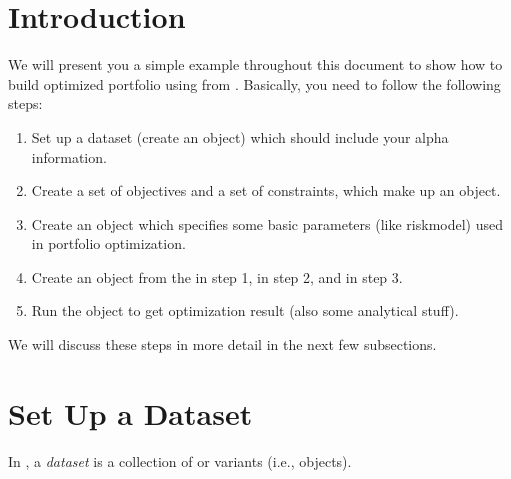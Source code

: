 \section{Introduction}
\setcounter{page}{1}

We will present you a simple example throughout this document to show how to build optimized portfolio using \axioma{} from \matlab.
Basically, you need to follow the following steps:

\begin{enumerate}
   \item Set up a dataset (create an  object) which should include your alpha information.
   \item Create a set of objectives and a set of constraints, which make up an  object.
   \item Create an  object which specifies some basic parameters (like riskmodel) used in portfolio optimization.
   \item Create an  object from the  in step 1,  in step 2,
         and  in step 3.
   \item Run the  object to get optimization result (also some analytical stuff).
\end{enumerate}

We will discuss these steps in more detail in the next few subsections.

\section{Set Up a Dataset}

In \matlab{}, a \emph{dataset} is a collection of  or  variants (i.e.,  objects).

